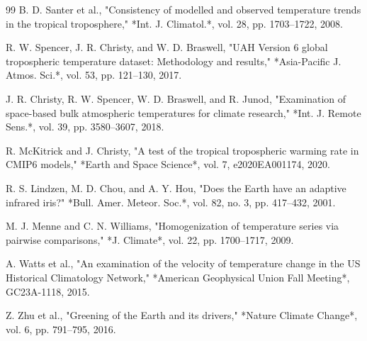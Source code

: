 \documentclass[10pt,twocolumn]{article}
\begin{document}
\begin{thebibliography}{99}
  B. D. Santer et al., "Consistency of modelled and observed temperature trends in the tropical troposphere," *Int. J. Climatol.*, vol. 28, pp. 1703–1722, 2008.

  R. W. Spencer, J. R. Christy, and W. D. Braswell, "UAH Version 6 global tropospheric temperature dataset: Methodology and results," *Asia-Pacific J. Atmos. Sci.*, vol. 53, pp. 121–130, 2017.

  J. R. Christy, R. W. Spencer, W. D. Braswell, and R. Junod, "Examination of space-based bulk atmospheric temperatures for climate research," *Int. J. Remote Sens.*, vol. 39, pp. 3580–3607, 2018.

  R. McKitrick and J. Christy, "A test of the tropical tropospheric warming rate in CMIP6 models," *Earth and Space Science*, vol. 7, e2020EA001174, 2020.

  R. S. Lindzen, M. D. Chou, and A. Y. Hou, "Does the Earth have an adaptive infrared iris?" *Bull. Amer. Meteor. Soc.*, vol. 82, no. 3, pp. 417–432, 2001.

  M. J. Menne and C. N. Williams, "Homogenization of temperature series via pairwise comparisons," *J. Climate*, vol. 22, pp. 1700–1717, 2009.

  A. Watts et al., "An examination of the velocity of temperature change in the US Historical Climatology Network," *American Geophysical Union Fall Meeting*, GC23A-1118, 2015.

  Z. Zhu et al., "Greening of the Earth and its drivers," *Nature Climate Change*, vol. 6, pp. 791–795, 2016.
\end{thebibliography}
\end{document}
